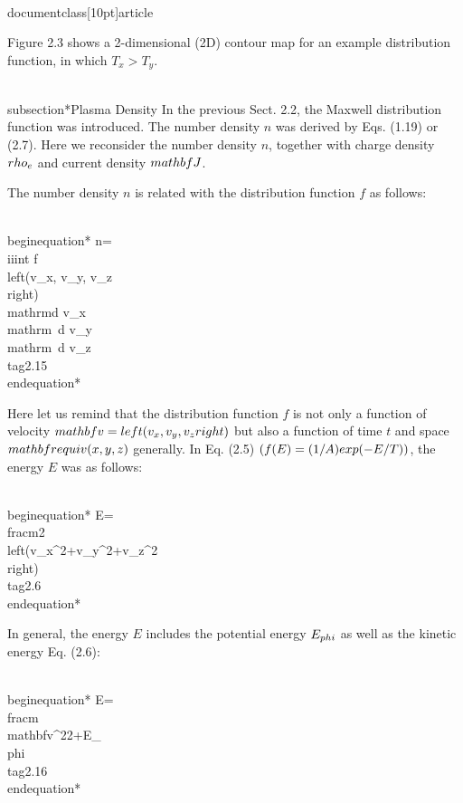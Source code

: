 \\documentclass[10pt]{article}
\begin{document}
Figure 2.3 shows a 2-dimensional (2D) contour map for an example distribution function, in which $T_{x}>T_{y}$.

\\subsection*{Plasma Density}
In the previous Sect. 2.2, the Maxwell distribution function was introduced. The number density $n$ was derived by Eqs. (1.19) or (2.7). Here we reconsider the number density $n$, together with charge density $\\rho_{e}$ and current density $\\mathbf{J}$.

The number density $n$ is related with the distribution function $f$ as follows:


\\begin{equation*}
n=\\iiint f\\left(v_{x}, v_{y}, v_{z}\\right) \\mathrm{d} v_{x} \\mathrm{~d} v_{y} \\mathrm{~d} v_{z} \\tag{2.15}
\\end{equation*}


Here let us remind that the distribution function $f$ is not only a function of velocity $\\mathbf{v}=\\left(v_{x}, v_{y}, v_{z}\\right)$ but also a function of time $t$ and space $\\mathbf{r} \\equiv(x, y, z)$ generally. In Eq. (2.5) $(f(E)=(1 / A) \\exp (-E / T))$, the energy $E$ was as follows:


\\begin{equation*}
E=\\frac{m}{2}\\left(v_{x}^{2}+v_{y}^{2}+v_{z}^{2}\\right) \\tag{2.6}
\\end{equation*}


In general, the energy $E$ includes the potential energy $E_{\\phi}$ as well as the kinetic energy Eq. (2.6):


\\begin{equation*}
E=\\frac{m \\mathbf{v}^{2}}{2}+E_{\\phi} \\tag{2.16}
\\end{equation*}
\end{document}
